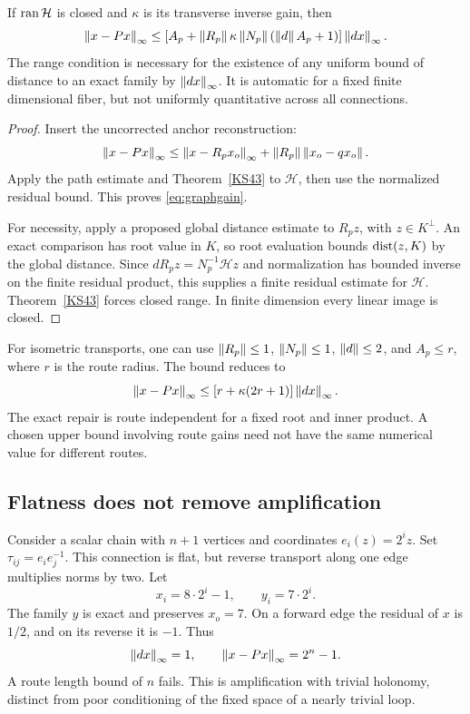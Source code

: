 \begin{theorem}\label{KS44}
If \(\operatorname{ran}\mathcal H\) is closed and \(\kappa\) is its transverse inverse gain, then
\begin{equation}\label{eq:graphgain}
 \left\lVert x-Px\right\rVert_\infty\le
 \left[A_p+\left\lVert R_p\right\rVert\kappa\left\lVert N_p\right\rVert(\left\lVert d\right\rVert A_p+1)\right]
 \left\lVert dx\right\rVert_\infty.
\end{equation}
The range condition is necessary for the existence of any uniform bound of distance to an exact family by \(\left\lVert dx\right\rVert_\infty\). It is automatic for a fixed finite dimensional fiber, but not uniformly quantitative across all connections.
\end{theorem}
\begin{proof}
Insert the uncorrected anchor reconstruction:
\[
 \left\lVert x-Px\right\rVert_\infty
 \le\left\lVert x-R_px_o\right\rVert_\infty+
\left\lVert R_p\right\rVert\left\lVert x_o-qx_o\right\rVert.
\]
Apply the path estimate and Theorem~\ref{KS43} to \(\mathcal H\), then use the normalized residual bound. This proves \eqref{eq:graphgain}.

For necessity, apply a proposed global distance estimate to \(R_pz\), with \(z\in K^\perp\). An exact comparison has root value in \(K\), so root evaluation bounds \(\operatorname{dist}(z,K)\) by the global distance. Since \(dR_pz=N_p^{-1}\mathcal Hz\) and normalization has bounded inverse on the finite residual product, this supplies a finite residual estimate for \(\mathcal H\). Theorem~\ref{KS43} forces closed range. In finite dimension every linear image is closed.
\end{proof}
For isometric transports, one can use \(\left\lVert R_p\right\rVert\le1\), \(\left\lVert N_p\right\rVert\le1\), \(\left\lVert d\right\rVert\le2\), and \(A_p\le r\), where \(r\) is the route radius. The bound reduces to
\[
 \left\lVert x-Px\right\rVert_\infty\le[r+\kappa(2r+1)]\left\lVert dx\right\rVert_\infty.
\]
The exact repair is route independent for a fixed root and inner product. A chosen upper bound involving route gains need not have the same numerical value for different routes.

\subsection{Flatness does not remove amplification}
Consider a scalar chain with \(n+1\) vertices and coordinates \(e_i(z)=2^iz\). Set \(\tau_{ij}=e_ie_j^{-1}\). This connection is flat, but reverse transport along one edge multiplies norms by two. Let
\[
 x_i=8\cdot2^i-1,\qquad y_i=7\cdot2^i.
\]
The family \(y\) is exact and preserves \(x_o=7\). On a forward edge the residual of \(x\) is \(1/2\), and on its reverse it is \(-1\). Thus
\[
 \left\lVert dx\right\rVert_\infty=1,\qquad
 \left\lVert x-Px\right\rVert_\infty=2^n-1.
\]
A route length bound of \(n\) fails. This is amplification with trivial holonomy, distinct from poor conditioning of the fixed space of a nearly trivial loop.

